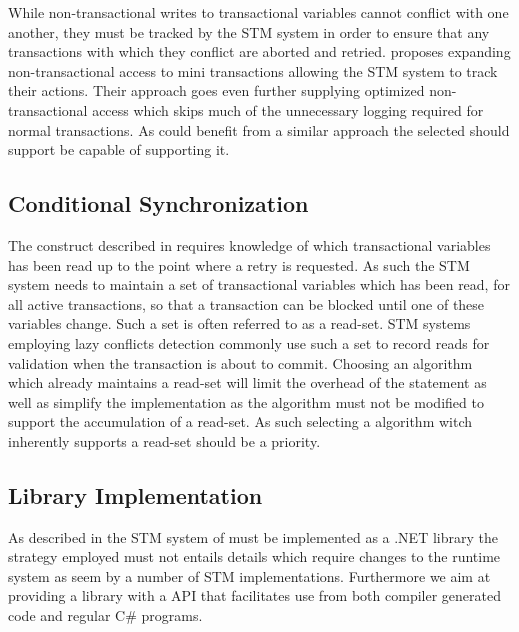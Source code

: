 While non-transactional writes to transactional variables cannot conflict with one another, they must be tracked by the \ac{STM} system in order to ensure that any transactions with which they conflict are aborted and retried. \cite{hindman2006atomicity} proposes expanding non-transactional access to mini transactions allowing the \ac{STM} system to track their actions. Their approach goes even further supplying optimized non-transactional access which skips much of the unnecessary logging required for normal transactions. As \stmnamesp could benefit from a similar approach the selected should support be capable of supporting it.
 
\subsection{Conditional Synchronization}
The  construct described in  requires knowledge of which transactional variables has been read up to the point where a retry is requested\cite{harris2005composable}. As such the \ac{STM} system needs to maintain a set of transactional variables which has been read, for all active transactions, so that a transaction can be blocked until one of these variables change. Such a set is often referred to as a read-set\cite{dice2006transactional}\cite{harris2010transactional}\cite{herlihy2012art}. \ac{STM} systems employing lazy conflicts detection commonly use such a set to record reads for validation when the transaction is about to commit\cite{dice2006transactional}\cite{mohamedin2013bytestm}. Choosing an algorithm which already maintains a read-set will limit the overhead of the  statement as well as simplify the implementation as the algorithm must not be modified to support the accumulation of a read-set. As such selecting a algorithm witch inherently supports a read-set should be a priority.

\subsection{Library Implementation}
As described in \bsref{} the \ac{STM} system of \stmnamesp must be implemented as a .NET library the strategy employed must not entails details which require changes to the runtime system as seem by a number of \ac{STM} implementations\cite{mohamedin2013bytestm}\cite{harris2003language}. Furthermore we aim at providing a library with a \ac{API} that facilitates use from both compiler generated code and regular C\# programs.

